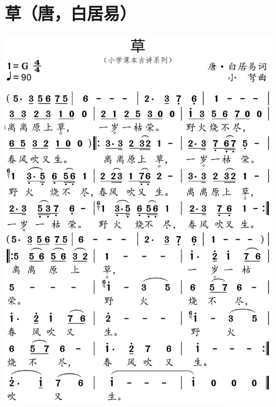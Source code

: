 \documentclass[cn,pad,twocol]{elegantbook}
\begin{document}
\section{草（唐，白居易）}      \includegraphics[width=0.9\textwidth]{dongxiao/20200627-古诗-草.jpg}   
\end{document}
